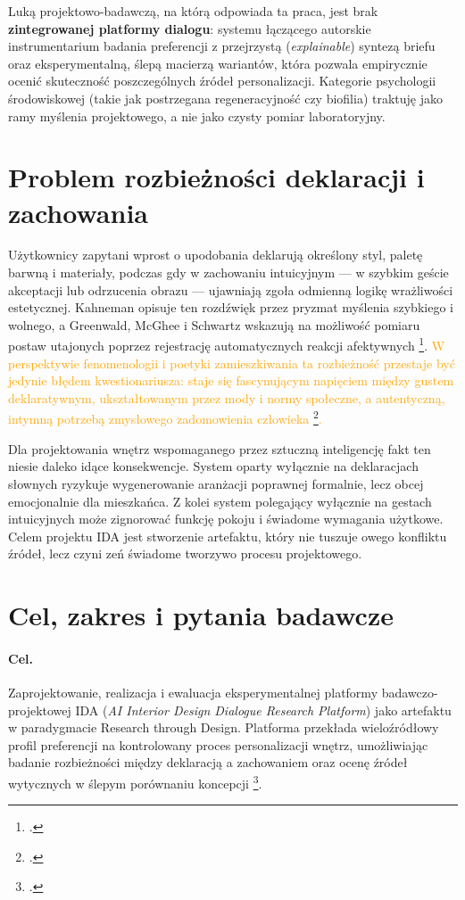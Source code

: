 Luką projektowo-badawczą, na którą odpowiada ta praca, jest brak \textbf{zintegrowanej platformy dialogu}: systemu łączącego autorskie instrumentarium badania preferencji z przejrzystą (\emph{explainable}) syntezą briefu oraz eksperymentalną, ślepą macierzą wariantów, która pozwala empirycznie ocenić skuteczność poszczególnych źródeł personalizacji.
Kategorie psychologii środowiskowej (takie jak postrzegana regeneracyjność czy biofilia) traktuję jako ramy myślenia projektowego, a nie jako czysty pomiar laboratoryjny.

\section{Problem rozbieżności deklaracji i zachowania}
\label{ch01:sec:problem}

Użytkownicy zapytani wprost o upodobania deklarują określony styl, paletę barwną i materiały, podczas gdy w zachowaniu intuicyjnym --- w szybkim geście akceptacji lub odrzucenia obrazu --- ujawniają zgoła odmienną logikę wrażliwości estetycznej.
Kahneman opisuje ten rozdźwięk przez pryzmat myślenia szybkiego i wolnego, a Greenwald, McGhee i Schwartz wskazują na możliwość pomiaru postaw utajonych poprzez rejestrację automatycznych reakcji afektywnych \footcite{kahneman2011thinking,greenwald1998iat}.
\textcolor{orange}{W perspektywie fenomenologii i poetyki zamieszkiwania ta rozbieżność przestaje być jedynie błędem kwestionariusza: staje się fascynującym napięciem między gustem deklaratywnym, ukształtowanym przez mody i normy społeczne, a autentyczną, intymną potrzebą zmysłowego zadomowienia człowieka \footcite{bachelard1975wyobraznia,pallasmaa2012oczy}.}

Dla projektowania wnętrz wspomaganego przez sztuczną inteligencję fakt ten niesie daleko idące konsekwencje. System oparty wyłącznie na deklaracjach słownych ryzykuje wygenerowanie aranżacji poprawnej formalnie, lecz obcej emocjonalnie dla mieszkańca. Z kolei system polegający wyłącznie na gestach intuicyjnych może zignorować funkcję pokoju i świadome wymagania użytkowe.
Celem projektu IDA jest stworzenie artefaktu, który nie tuszuje owego konfliktu źródeł, lecz czyni zeń świadome tworzywo procesu projektowego.

\section{Cel, zakres i pytania badawcze}
\label{ch01:sec:cel}

\paragraph{Cel.}
Zaprojektowanie, realizacja i ewaluacja eksperymentalnej platformy badawczo-projektowej IDA (\emph{AI Interior Design Dialogue Research Platform}) jako artefaktu w paradygmacie Research through Design. Platforma przekłada wieloźródłowy profil preferencji na kontrolowany proces personalizacji wnętrz, umożliwiając badanie rozbieżności między deklaracją a zachowaniem oraz ocenę źródeł wytycznych w ślepym porównaniu koncepcji \footcite{idaPlatform2026}.

